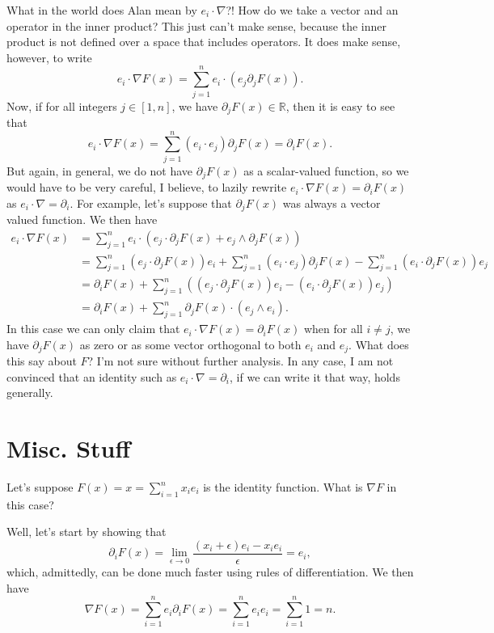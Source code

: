 \documentclass[12pt]{article}
\newcommand{\R}{\mathbb{R}}
\begin{document}
What in the world does Alan mean by $e_i\cdot\nabla$?!  How do we take
a vector and an operator in the inner product?  This just can't make sense,
because the inner product is not defined over a space that includes operators.
It does make sense, however, to write
\begin{equation*}
e_i\cdot\nabla F(x) = \sum_{j=1}^n e_i\cdot\left(e_j\partial_j F(x)\right).
\end{equation*}
Now, if for all integers $j\in[1,n]$, we have $\partial_j F(x)\in\R$, then
it is easy to see that
\begin{equation*}
e_i\cdot\nabla F(x) = \sum_{j=1}^n(e_i\cdot e_j)\partial_j F(x) = \partial_i F(x).
\end{equation*}
But again, in general, we do not have $\partial_j F(x)$ as a scalar-valued function,
so we would have to be very careful, I believe, to lazily rewrite
$e_i\cdot\nabla F(x) = \partial_i F(x)$ as $e_i\cdot\nabla = \partial_i$.
For example, let's suppose that $\partial_j F(x)$ was always a vector valued function.
We then have
\begin{align*}
e_i\cdot\nabla F(x) &= \sum_{j=1}^n e_i\cdot(e_j\cdot \partial_j F(x) + e_j\wedge\partial_j F(x)) \\
 &= \sum_{j=1}^n (e_j\cdot\partial_j F(x))e_i + \sum_{j=1}^n (e_i\cdot e_j)\partial_j F(x) - \sum_{j=1}^n (e_i\cdot \partial_j F(x))e_j \\
 &= \partial_i F(x) + \sum_{j=1}^n\left( (e_j\cdot\partial_j F(x))e_i - (e_i\cdot\partial_j F(x))e_j\right) \\
 &= \partial_i F(x) + \sum_{j=1}^n \partial_j F(x)\cdot(e_j\wedge e_i).
\end{align*}
In this case we can only claim that $e_i\cdot\nabla F(x)=\partial_i F(x)$ when for all $i\neq j$,
we have $\partial_j F(x)$ as zero or as some vector orthogonal to both $e_i$ and $e_j$.
What does this say about $F$?  I'm not sure without further analysis.  In any case,
I am not convinced that an identity such as $e_i\cdot\nabla=\partial_i$, if we can
write it that way, holds generally.

\section*{Misc. Stuff}

Let's suppose $F(x)=x=\sum_{i=1}^n x_ie_i$ is the identity function.  What is $\nabla F$ in this case?

Well, let's start by showing that
\begin{equation*}
\partial_i F(x) = \lim_{\epsilon\to 0}\frac{(x_i+\epsilon)e_i-x_ie_i}{\epsilon} = e_i,
\end{equation*}
which, admittedly, can be done much faster using rules of differentiation.  We then have
\begin{equation*}
\nabla F(x) = \sum_{i=1}^n e_i\partial_i F(x)
 = \sum_{i=1}^n e_ie_i
 = \sum_{i=1}^n 1
 = n.
\end{equation*}
\end{document}
